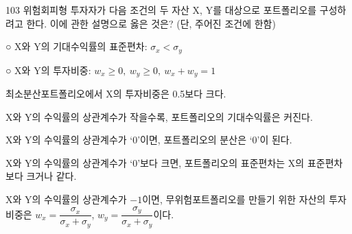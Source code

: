 \begin{question}{103}
위험회피형 투자자가 다음 조건의 두 자산 X, Y를 대상으로 포트폴리오를 구성하려고 한다. 이에 관한 설명으로 옳은 것은? (단, 주어진 조건에 한함)
\begin{framedtext}
○ X와 Y의 기대수익률의 표준편차: $\sigma_{x}<\sigma_{y}$ \par
○ X와 Y의 투자비중: $w_{x}\geq 0,\ w_{y}\geq 0,\ w_{x}+w_{y}=1$ \par
\end{framedtext}
\begin{choices}
  \item 최소분산포트폴리오에서 X의 투자비중은 0.5보다 크다.
  \item X와 Y의 수익률의 상관계수가 작을수록, 포트폴리오의 기대수익률은 커진다.
  \item X와 Y의 수익률의 상관계수가 ‘0’이면, 포트폴리오의 분산은 ‘0’이 된다.
  \item X와 Y의 수익률의 상관계수가 ‘0’보다 크면, 포트폴리오의 표준편차는 X의 표준편차보다 크거나 같다.
  \item X와 Y의 수익률의 상관계수가 $-1$이면, 무위험포트폴리오를 만들기 위한 자산의 투자비중은 $w_{x}=\dfrac{\sigma_{x}}{\sigma_{x}+\sigma_{y}}$, $w_{y}=\dfrac{\sigma_{y}}{\sigma_{x}+\sigma_{y}}$이다.
\end{choices}
\end{question}
